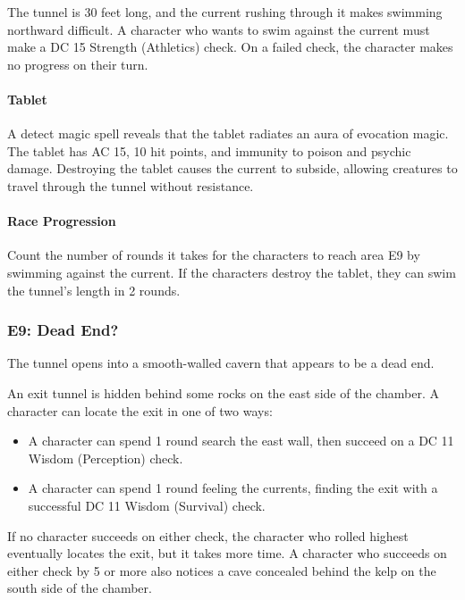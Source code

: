 \documentclass[10pt,a4paper,twoside,twocolumn,openany,nodeprecatedcode]{dndbook}
\begin{document}
The tunnel is 30 feet long, and the current rushing through it makes swimming northward difficult. A character who wants to swim against the current must make a DC 15 Strength (Athletics) check. On a failed check, the character makes no progress on their turn.

\paragraph{Tablet}
A detect magic spell reveals that the tablet radiates an aura of evocation magic. The tablet has AC 15, 10 hit points, and immunity to poison and psychic damage. Destroying the tablet causes the current to subside, allowing creatures to travel through the tunnel without resistance.

\paragraph{Race Progression}
Count the number of rounds it takes for the characters to reach area E9 by swimming against the current. If the characters destroy the tablet, they can swim the tunnel's length in 2 rounds.

\subsubsection{E9: Dead End?}
\begin{DndReadAloud}{}
The tunnel opens into a smooth-walled cavern that appears to be a dead end.

\end{DndReadAloud}

An exit tunnel is hidden behind some rocks on the east side of the chamber. A character can locate the exit in one of two ways:


\begin{itemize}
\item A character can spend 1 round search the east wall, then succeed on a DC 11 Wisdom (Perception) check.
\item A character can spend 1 round feeling the currents, finding the exit with a successful DC 11 Wisdom (Survival) check.
\end{itemize}

If no character succeeds on either check, the character who rolled highest eventually locates the exit, but it takes more time. A character who succeeds on either check by 5 or more also notices a cave concealed behind the kelp on the south side of the chamber.
\end{document}
